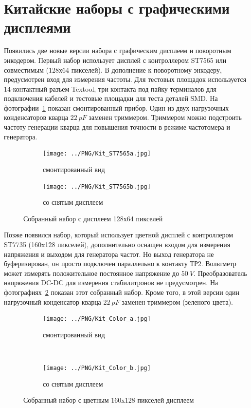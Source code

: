 \section{Китайские наборы с графическими дисплеями}
Появились две новые версии набора с графическим дисплеем и поворотным энкодером.
Первый набор использует дисплей с контроллером ST7565 или совместимым (128х64 пикселей).
В дополнение к поворотному энкодеру, предусмотрен вход для измерения частоты.
Для тестовых площадок используется 14-контактный разъем Textool, три контакта под пайку
терминалов для подключения кабелей и тестовые площадки для теста деталей SMD.
На фотографии~\ref{fig:Kit_mono} показан смонтированный прибор.
Один из двух нагрузочных конденсаторов кварца \(22~pF\) заменен триммером.
Триммером можно подстроить частоту генерации кварца для повышения точности в режиме частотомера и генератора.
\begin{figure}[H]
  \begin{subfigure}[b]{.5\textwidth}
    \centering
    \texttt{[image: ../PNG/Kit\_ST7565a.jpg]}
    \caption{смонтированный вид}
  \end{subfigure}
  \begin{subfigure}[b]{.5\textwidth}
    \centering
    \texttt{[image: ../PNG/Kit\_ST7565b.jpg]}
    \caption{со снятым дисплеем}
  \end{subfigure}
  \caption{Собранный набор с дисплеем 128х64 пикселей}
  \label{fig:Kit_mono}
\end{figure}
Позже появился набор, который использует цветной дисплей с контроллером ST7735 (160x128 пикселей), 
дополнительно оснащен входом для измерения напряжения и выходом для генератора частот.
Но выход генератора не буферизирован, он просто подключен параллельно к контакту ТР2.
Вольтметр может измерять положительное постоянное  напряжение до \(50~V\).
Преобразователь напряжения DC-DC для измерения стабилитронов не предусмотрен.
На фотографиях~\ref{fig:Kit_color} показан этот собранный набор.
Кроме того, в этой версии один нагрузочный конденсатор кварца \(22~pF\) заменен триммером (зеленого цвета).
\begin{figure}[H]
  \begin{subfigure}[b]{.5\textwidth}
    \centering
    \texttt{[image: ../PNG/Kit\_Color\_a.jpg]}
    \caption{смонтированный вид}
  \end{subfigure}
  ~
  \begin{subfigure}[b]{.5\textwidth}
    \centering
    \texttt{[image: ../PNG/Kit\_Color\_b.jpg]}
    \caption{со снятым дисплеем}
  \end{subfigure}
  \caption{Собранный набор с цветным 160x128 пикселей дисплеем}
  \label{fig:Kit_color}
\end{figure}
